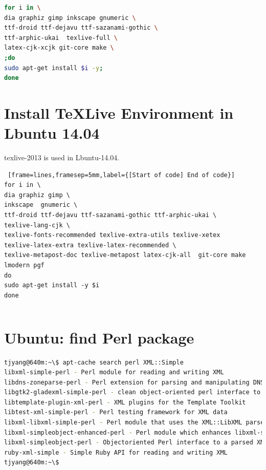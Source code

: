 \begin{lstlisting}[language=Bash]
for i in \
dia graphiz gimp inkscape gnumeric \
ttf-droid ttf-dejavu ttf-sazanami-gothic \
ttf-arphic-ukai  texlive-full \
latex-cjk-xcjk git-core make \
;do 
sudo apt-get install $i -y; 
done
\end{lstlisting}

\section{Install \TeX Live Environment in Lbuntu 14.04}
texlive-2013 is used in Lbuntu-14.04.

\begin{Verbatim} [frame=lines,framesep=5mm,label={[Start of code] End of code}]
for i in \
dia graphiz gimp \
inkscape  gnumeric \
ttf-droid ttf-dejavu ttf-sazanami-gothic ttf-arphic-ukai \
texlive-lang-cjk \
texlive-fonts-recommended texlive-extra-utils texlive-xetex 
texlive-latex-extra texlive-latex-recommended \
texlive-metapost-doc texlive-metapost latex-cjk-all  git-core make lmodern pgf
do 
sudo apt-get install -y $i  
done

\end{Verbatim}

\begin{lstlisting}[language=Bash]
\end{lstlisting}

\section{Ubuntu: find Perl package}
\begin{lstlisting}[language=Bash]
tjyang@640m:~\$ apt-cache search perl XML::Simple
libxml-simple-perl - Perl module for reading and writing XML
libdns-zoneparse-perl - Perl extension for parsing and manipulating DNS Zone Files
libgtk2-gladexml-simple-perl - clean object-oriented perl interface to Gtk2::GladeXML
libtemplate-plugin-xml-perl - XML plugins for the Template Toolkit
libtest-xml-simple-perl - Perl testing framework for XML data
libxml-libxml-simple-perl - Perl module that uses the XML::LibXML parser for XML structures
libxml-simpleobject-enhanced-perl - Perl module which enhances libxml-simpleobject-perl
libxml-simpleobject-perl - Objectoriented Perl interface to a parsed XML::Parser tree
ruby-xml-simple - Simple Ruby API for reading and writing XML
tjyang@640m:~\$ 
\end{lstlisting}


